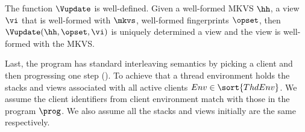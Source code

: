 \begin{lemma}
The function $\Vupdate$ is well-defined.
Given a well-formed MKVS $\hh$, a view $\vi$ that is well-formed with \( \mkvs \), well-formed fingerprints \( \opset \), then $\Vupdate(\hh, \opset, \vi)$ is uniquely determined a view and the view is well-formed with the MKVS.
\end{lemma}

                                                                                                         
Last, the program has standard interleaving semantics by picking a client and then progressing one step ().
To achieve that a thread environment holds the stacks and views associated with all active clients \( Env \in \sort{ThdEnv} \).
We assume the client identifiers from client environment match with those in the program \( \prog \).
We also assume all the stacks and views initially are the same respectively.
